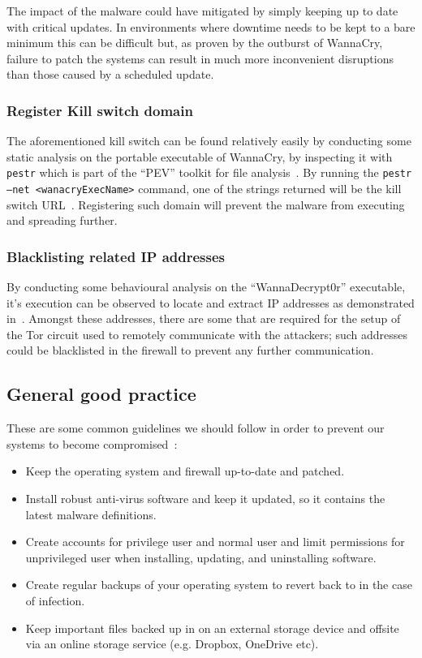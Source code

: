 \documentclass[10pt,a4paper]{article}
\begin{document}
The impact of the malware could have mitigated by simply keeping up to date with critical updates. In environments where downtime needs to be kept to a bare minimum this can be difficult but, as proven by the outburst of WannaCry, failure to patch the systems can result in much more inconvenient disruptions than those caused by a scheduled update.

\subsubsection{Register Kill switch domain}
The aforementioned kill switch can be found relatively easily by conducting some static analysis on the portable executable of WannaCry, by inspecting it with \texttt{pestr} which is part of the ``PEV'' toolkit for file analysis~\cite{PEtoolkit}. By running the \texttt{pestr --net <wanacryExecName>} command, one of the strings returned will be the kill switch URL~\cite{pestrVideo}. Registering such domain will prevent the malware from executing and spreading further.

\subsubsection{Blacklisting related IP addresses}
By conducting some behavioural analysis on the ``WannaDecrypt0r'' executable, it's execution can be observed to locate and extract IP addresses as demonstrated in~\cite{wanacryFindIpAddr}. Amongst these addresses, there are some that are required for the setup of the Tor circuit used to remotely communicate with the attackers; such addresses could be blacklisted in the firewall to prevent any further communication.

\subsection{General good practice}
These are some common guidelines we should follow in order to prevent our systems to become compromised~\cite{genernalmitigation}: 
\begin{itemize}
\setlength\itemsep{-0.5em}
\item Keep the operating system and firewall up-to-date and patched.
\item Install robust anti-virus software and keep it updated, so it contains the latest malware definitions.
\item Create accounts for privilege user and normal user and limit permissions for unprivileged user when installing, updating, and uninstalling software.
\item Create regular backups of your operating system to revert back to in the case of infection.
\item Keep important files backed up in on an external storage device and offsite via an online storage service (e.g. Dropbox, OneDrive etc).
\end{itemize}
\end{document}
